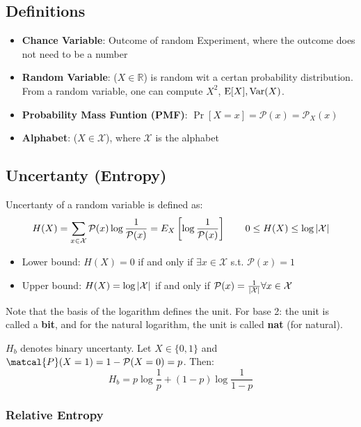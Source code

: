 \documentclass[a4paper]{article}
\begin{document}
\begin{twocolumn} 

\section{Definitions}

\begin{itemize}
    \item \textbf{Chance Variable}: Outcome of random Experiment, where the outcome does not need to be a number
    \item \textbf{Random Variable}: ($X \in \mathbb{R}$) is random wit a certan probability distribution. From a random variable, one can compute $X^2$, $\operatorname{E}[X], \operatorname{Var}(X)$.
    \item \textbf{Probability Mass Funtion (PMF)}: $\Pr[X=x] = \mathcal{P}(x) = \mathcal{P}_X(x)$
    \item \textbf{Alphabet}: ($X \in \mathcal{X}$), where $\mathcal{X}$ is the alphabet
\end{itemize}

\subsection{Uncertanty (Entropy)}

Uncertanty of a random variable is defined as:
\[H(X) = \sum_{x \in \mathcal{X}} \mathcal{P}(x) \log \frac{1}{\mathcal{P}(x)} = E_X \left[ \log \frac{1}{\mathcal{P}(x)} \right] \qquad 0 \leq H(X) \leq \log \left| \mathcal{X} \right|\]

\begin{itemize}
    \item Lower bound: $H(X) = 0$ if and only if $\exists x \in \mathcal{X}$ s.t. $\mathcal{P}(x) = 1$
    \item Upper bound: $H(X) = \log \left| \mathcal{X} \right|$ if and only if $\mathcal{P}(x) = \frac{1}{\left| \mathcal{X} \right|} \forall x \in \mathcal{X}$
\end{itemize}

Note that the basis of the logarithm defines the unit. For base 2: the unit is called a \textbf{bit}, and for the natural logarithm, the unit is called \textbf{nat} (for natural).

$H_b$ denotes binary uncertanty. Let $X \in \{0,1\}$ and $\matcal{P}(X=1) = 1-\mathcal{P}(X=0) = p$. Then:
\[H_b = p \log \frac{1}{p} + (1-p) \log \frac{1}{1-p}\]

\subsubsection{Relative Entropy}


\end{twocolumn}
\end{document}
